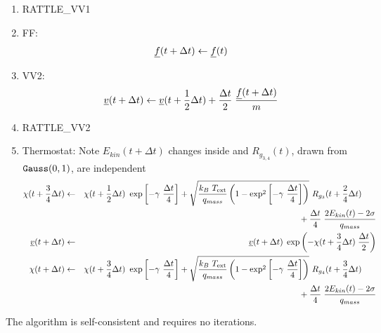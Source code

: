 \begin{enumerate}
\item RATTLE\_VV1
\item FF:
\begin{equation}
\mbox{$\underline{f}$}(t + \Delta t) \leftarrow \mbox{$\underline{f}$}(t)
\end{equation}
\item VV2:
\begin{equation}
\mbox{$\underline{v}$}(t + \Delta t) \leftarrow \mbox{$\underline{v}$}(t + {1 \over 2} \Delta t) +
{\Delta t \over 2} \; {\mbox{$\underline{f}$}(t + \Delta t) \over m}
\end{equation}
\item RATTLE\_VV2
\item Thermostat: Note $E_{kin}(t + \Delta t)$ changes inside and $R_{g_{3,4}}(t)$, drawn from ${\tt Gauss}(0,1)$, are independent
\begin{eqnarray}
\chi (t + {3 \over 4} \Delta t) &\leftarrow& \chi (t + {1 \over 2} \Delta t) ~ \exp \left[-\gamma~{\Delta t \over 4} \right] +
\sqrt{\frac{k_{B}~T_{\rm ext}}{q_{mass}}\left(1-\exp^{2} \left[-\gamma~{\Delta t \over 4} \right]\right)}~R_{g_{3}}(t + {2 \over 4} \Delta t) \phantom{xxx} \nonumber \\
& &\phantom{xxxxxxxxxxxxxxxx} + {\Delta t \over 4} \; {{2 E_{kin}(t) - 2 \sigma} \over q_{mass}} \nonumber \\
\mbox{$\underline{v}$}(t + \Delta t) &\leftarrow& \mbox{$\underline{v}$}(t + \Delta t) \; \exp \left(
-\chi (t + {3 \over 4} \Delta t) \; {\Delta t \over 2} \right) \\
\chi (t + \Delta t) &\leftarrow& \chi (t + {3 \over 4} \Delta t) ~ \exp \left[-\gamma~{\Delta t \over 4} \right] +
\sqrt{\frac{k_{B}~T_{\rm ext}}{q_{mass}}\left(1-\exp^{2} \left[-\gamma~{\Delta t \over 4} \right]\right)}~R_{g_{4}}(t + {3 \over 4} \Delta t) \phantom{xxx} \nonumber \\
& &\phantom{xxxxxxxxxxxxxxxx} + {\Delta t \over 4} \; {{2 E_{kin}(t) - 2 \sigma} \over q_{mass}} \nonumber
\end{eqnarray}
\end{enumerate}
The algorithm is self-consistent and requires no iterations.

